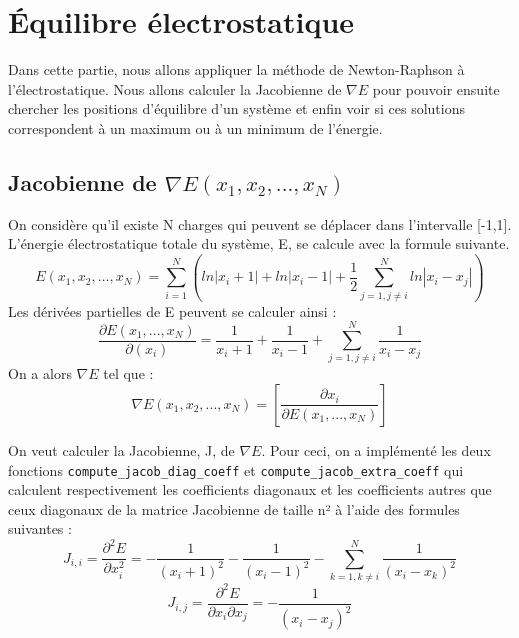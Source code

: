 \section{Équilibre électrostatique}
    Dans cette partie, nous allons appliquer la méthode de Newton-Raphson à l'électrostatique.
    Nous allons calculer la Jacobienne de $\nabla E$ pour pouvoir ensuite chercher les positions d'équilibre d'un système et enfin voir si ces solutions correspondent à un 
    maximum ou à un minimum de l'énergie.
\subsection{Jacobienne de $\nabla$$E(x_{1},x_{2},...,x_{N})$}
On considère qu'il existe N charges qui peuvent se déplacer dans l'intervalle [-1,1]. 
L'énergie électrostatique totale du système, E, se calcule avec la formule suivante.\\
\begin{equation*}
    E(x_{1},x_{2},...,x_{N})=\sum_{i=1}^{N}\left(ln|x_{i}+1|+ln|x_{i}-1|+\frac{1}{2}\sum_{j=1,j\not=i}^{N} ln|x_{i}-x_{j}|\right)
\end{equation*}
Les dérivées partielles de E peuvent se calculer ainsi :
\begin{equation*}
    \frac{\partial E(x_1, ..., x_N)}{\partial (x_i)} = \frac{1}{x_i+1} + \frac{1}{x_i-1} + \sum_{j=1,j\neq i}^{N} \frac{1}{x_i - x_j}
\end{equation*}
On a alors $\nabla E$ tel que : 
\begin{equation*}
    \nabla E(x_{1}, x_{2}, ..., x_{N}) = \left[\frac{\partial x_{i}}{\partial E(x_{1},...,x_{N})}\right]
\end{equation*}

On veut calculer la Jacobienne, J, de $\nabla E$. Pour ceci, on a implémenté les deux fonctions \verb|compute_jacob_diag_coeff| et \verb|compute_jacob_extra_coeff| qui calculent respectivement les coefficients diagonaux et les coefficients autres que ceux diagonaux de  la matrice Jacobienne de taille n² à l'aide des formules suivantes : 
\begin{equation*}
    J_{i,i} = \frac{\partial^2 E}{\partial x_i^2} = -\frac{1}{(x_i+1)^2} - \frac{1}{(x_i-1)^2} - \sum_{k=1, k\neq i}^{N} \frac{1}{(x_i - x_k)^2}
\end{equation*}
\begin{equation*}
    J_{i,j} = \frac{\partial^2 E}{\partial x_i \partial x_j} = -\frac{1}{(x_i - x_j)^2}
\end{equation*}

